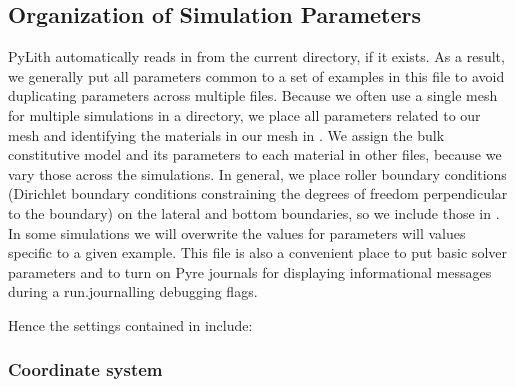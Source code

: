 \subsection{Organization of Simulation Parameters}
\label{sec:example:subduction:3d:organization}

PyLith automatically reads in  from the
current directory, if it exists. As a result, we generally put all
parameters common to a set of examples in this file to avoid
duplicating parameters across multiple files. Because we often use a
single mesh for multiple simulations in a directory, we place all
parameters related to our mesh and identifying the materials in our
mesh in . We assign the bulk constitutive
model and its parameters to each material in other files, because we
vary those across the simulations. In general, we place roller
boundary conditions (Dirichlet boundary conditions constraining the
degrees of freedom perpendicular to the boundary) on the lateral and
bottom boundaries, so we include those in . In
some simulations we will overwrite the values for parameters will
values specific to a given example. This file is also a convenient
place to put basic solver parameters and to turn on Pyre journals for
displaying informational messages during a run.journalling debugging
flags.

Hence the settings contained in  include:
\begin{inventory}
\end{inventory}

\subsubsection{Coordinate system}

